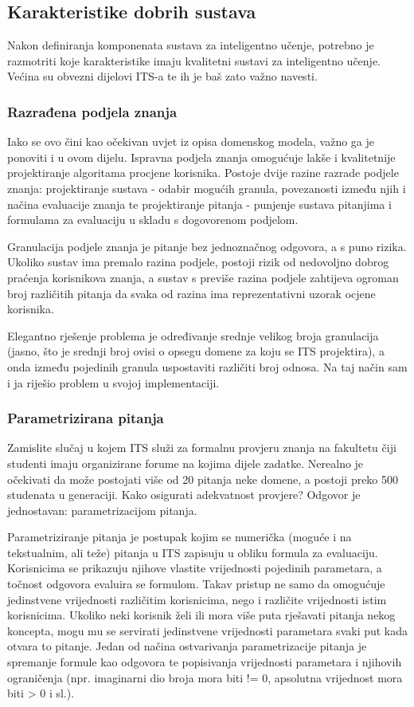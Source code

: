 \documentclass[times, utf8, zavrsni]{fer}
\begin{document}
\subsection{Karakteristike dobrih sustava}
Nakon definiranja komponenata sustava za inteligentno učenje, potrebno je razmotriti koje karakteristike imaju kvalitetni sustavi za inteligentno učenje. Većina su obvezni dijelovi ITS-a te ih je baš zato važno navesti.

\subsubsection{Razrađena podjela znanja}
Iako se ovo čini kao očekivan uvjet iz  opisa domenskog modela, važno ga je ponoviti i u ovom dijelu. Ispravna podjela znanja omogućuje lakše i kvalitetnije projektiranje algoritama procjene korisnika. Postoje dvije razine razrade podjele znanja: projektiranje sustava - odabir mogućih granula, povezanosti između njih i načina evaluacije znanja te projektiranje pitanja - punjenje sustava pitanjima i formulama za evaluaciju u skladu s dogovorenom podjelom.
\par
Granulacija podjele znanja je pitanje bez jednoznačnog odgovora, a s puno rizika. Ukoliko sustav ima premalo razina podjele, postoji rizik od nedovoljno dobrog praćenja korisnikova znanja, a sustav s previše razina podjele zahtijeva ogroman broj različitih pitanja da svaka od razina ima reprezentativni uzorak ocjene korisnika.
\par
Elegantno rješenje problema je određivanje srednje velikog broja granulacija (jasno, što je srednji broj ovisi o opsegu domene za koju se ITS projektira), a onda između pojedinih granula uspostaviti različiti broj odnosa. Na taj način sam i ja riješio problem u svojoj implementaciji.

\subsubsection{Parametrizirana pitanja}
Zamislite slučaj u kojem ITS služi za formalnu provjeru znanja na fakultetu čiji studenti imaju organizirane forume na kojima dijele zadatke. Nerealno je očekivati da može postojati više od 20 pitanja neke domene, a postoji preko 500 studenata u generaciji. Kako osigurati adekvatnost provjere? Odgovor je jednostavan: parametrizacijom pitanja.
\par
Parametriziranje pitanja je postupak kojim se numerička (moguće i na tekstualnim, ali teže) pitanja u ITS zapisuju u obliku formula za evaluaciju. Korisnicima se prikazuju njihove vlastite vrijednosti pojedinih parametara, a točnost odgovora evaluira se formulom. Takav pristup ne samo da omogućuje jedinstvene vrijednosti različitim korisnicima, nego i različite vrijednosti istim korisnicima. Ukoliko neki korisnik želi ili mora više puta rješavati pitanja nekog koncepta, mogu mu se servirati jedinstvene vrijednosti parametara svaki put kada otvara to pitanje. Jedan od načina ostvarivanja parametrizacije pitanja je spremanje formule kao odgovora te popisivanja vrijednosti parametara i njihovih ograničenja (npr. imaginarni dio broja mora biti != 0, apsolutna vrijednost mora biti > 0 i sl.).
\end{document}
